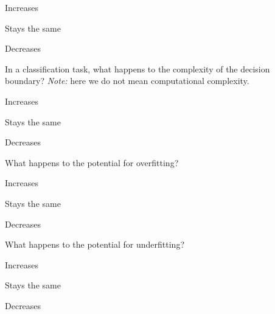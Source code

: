 \documentclass{csci1430}
\begin{document}
\begin{answerlist}
    \item Increases
    \item Stays the same
    \item Decreases
\end{answerlist}

\pagebreak
    
\begin{subquestion}[points=1]
In a classification task, what happens to the complexity of the decision boundary? \emph{Note:} here we do not mean computational complexity.
\end{subquestion}

\begin{answerlist}
    \item Increases
    \item Stays the same
    \item Decreases
\end{answerlist}

\begin{subquestion}[points=1]
What happens to the potential for overfitting?
\end{subquestion}
    
\begin{answerlist}
    \item Increases
    \item Stays the same
    \item Decreases
\end{answerlist}

\begin{subquestion}[points=1]
What happens to the potential for underfitting?
\end{subquestion}

\begin{answerlist}
    \item Increases
    \item Stays the same
    \item Decreases
\end{answerlist}

\pagebreak
\end{document}
